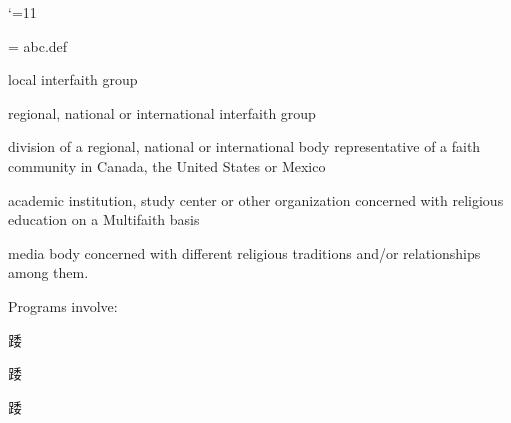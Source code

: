 \documentclass{article}
\begin{document}
\reversemarginpar               
\pgfrememberpicturepositiononpagetrue
\catcode`\@=11 



\def\False{false}
\def\InitCoordinateSystem{false}

\immediate{}= abc.def
\immediate{}


 
%
%
 \setcounter{sub_item}{0}
\immediate{} 
  

 
\addtocounter{sub_item}{1}   
  
local interfaith group
 \immediate{} 
\addtocounter{sub_item}{1}   
  
regional, national or international interfaith group
 \immediate{} 
\addtocounter{sub_item}{1}   
  
division of a regional, national or international body representative of a faith community in Canada, the United States or Mexico
 \immediate{} 
\addtocounter{sub_item}{1}   
  
academic institution, study center or other organization concerned with religious education on a Multifaith basis
 \immediate{} 
\addtocounter{sub_item}{1}   
  
media body concerned with different religious traditions and/or relationships among them.
 \immediate{} 
 
  
%
%
 \setcounter{sub_item}{0}
\immediate{} 
  
Programs involve:
 
\addtocounter{sub_item}{1}   

踒 
 \immediate{} 
\addtocounter{sub_item}{1}   

踒 
 \immediate{} 
\addtocounter{sub_item}{1}   

踒 
 \immediate{} 
 
  
%
%
 \setcounter{sub_item}{0}
\immediate{} 
  
\end{document}
